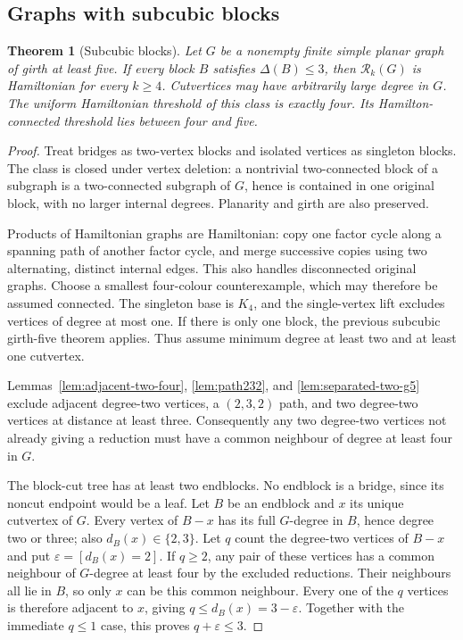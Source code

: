 \documentclass[11pt]{article}
\newtheorem{theorem}{Theorem}[section]
\theoremstyle{remark}
\newcommand{\Rk}{\mathcal R_k}
\numberwithin{equation}{section}
\numberwithin{table}{section}
\begin{document}
\subsection{Graphs with subcubic blocks}
\begin{theorem}[Subcubic blocks]\label{lem:block-subcubic}
Let $G$ be a nonempty finite simple planar graph of girth at least
five. If every block $B$ satisfies $\Delta(B)\le3$, then $\Rk(G)$ is
Hamiltonian for every $k\ge4$. Cutvertices may have arbitrarily large
degree in $G$. The uniform Hamiltonian threshold of this class is exactly four.
Its Hamilton-connected threshold lies between four and five.
\end{theorem}
\begin{proof}
Treat bridges as two-vertex blocks and isolated vertices as singleton
blocks. The class is closed under vertex deletion: a nontrivial
two-connected block of a subgraph is a two-connected subgraph of
$G$, hence is contained in one original block, with no larger
internal degrees. Planarity and girth are also preserved.

Products of Hamiltonian graphs are Hamiltonian: copy one factor
cycle along a spanning path of another factor cycle, and merge
successive copies using two alternating, distinct internal edges.
This also handles disconnected original graphs. Choose a smallest
four-colour counterexample, which may therefore be assumed connected.
The singleton base is $K_4$, and the single-vertex lift excludes
vertices of degree at most one. If there is only one block, the
previous subcubic girth-five theorem applies. Thus assume minimum
degree at least two and at least one cutvertex.

Lemmas~\ref{lem:adjacent-two-four}, \ref{lem:path232}, and
\ref{lem:separated-two-g5} exclude adjacent degree-two vertices, a
$(2,3,2)$ path, and two degree-two vertices at distance at least three.
Consequently any two degree-two vertices not already giving a
reduction must have a common neighbour of degree at least four in $G$.

The block-cut tree has at least two endblocks. No endblock is a
bridge, since its noncut endpoint would be a leaf. Let $B$ be an
endblock and $x$ its unique cutvertex of $G$. Every vertex of
$B-x$ has its full $G$-degree in $B$, hence degree two or three;
also $d_B(x)\in\{2,3\}$. Let $q$ count the degree-two vertices of $B-x$ and put
$\varepsilon=[d_B(x)=2]$. If $q\ge2$, any pair of these vertices
has a common neighbour of $G$-degree at least four by the excluded
reductions. Their neighbours all lie in $B$, so only $x$ can be
this common neighbour. Every one of the $q$ vertices is therefore
adjacent to $x$, giving $q\le d_B(x)=3-\varepsilon$. Together with
the immediate $q\le1$ case, this proves $q+\varepsilon\le3$.


\end{proof}
\end{document}
